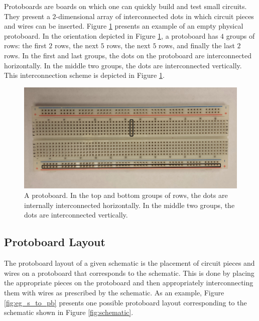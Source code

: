 Protoboards are boards on which one can quickly build and test
small circuits. They present a $2$-dimensional array of interconnected dots
in which circuit pieces and wires can be inserted. Figure
\ref{fig:physical_protoboard} presents an example of an empty physical
protoboard. In
the orientation depicted in Figure \ref{fig:physical_protoboard}, a protoboard
has $4$ groups of rows: the first $2$ rows, the next $5$ rows, the next $5$
rows, and finally the last $2$ rows. In the first and last groups, the dots on
the protoboard are interconnected horizontally. In the middle
two groups, the dots are interconnected vertically. This
interconnection scheme is depicted in Figure \ref{fig:physical_protoboard}.

\begin{figure}
\begin{center}
\includegraphics[width=\textwidth]{Images/physical_protoboard.jpg}
\caption[Protoboard]{A protoboard. In the top and bottom groups of rows,
the dots are internally interconnected horizontally.
In the middle two groups, the dots are interconnected vertically.}
\label{fig:physical_protoboard}
\end{center}
\end{figure}

\subsection{Protoboard Layout}

The protoboard layout of a given schematic is the placement of circuit pieces
and wires on a protoboard that corresponds to the schematic. This is done by
placing the appropriate pieces on the protoboard and then appropriately
interconnecting them with wires as prescribed by the schematic. As an example,
Figure \ref{fig:eg_s_to_pb} presents one possible protoboard layout
corresponding to the schematic shown in Figure \ref{fig:schematic}.

